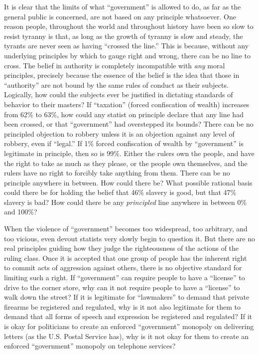 \documentclass{book}
\begin{document}
It is clear that the limits of what \enquote{government} is allowed to do, as far as the general public is concerned, are not based on any principle whatsoever. One reason people, throughout the world and throughout history have been so slow to resist tyranny is that, as long as the growth of tyranny is slow and steady, the tyrants are never seen as having \enquote{crossed the line.} This is because, without any underlying principles by which to gauge right and wrong, there can be no line to cross. The belief in authority is completely incompatible with \emph{any} moral principles, precisely because the essence of the belief is the idea that those in \enquote{authority} are not bound by the same rules of conduct as their subjects. Logically, how could the subjects ever be justified in dictating standards of behavior to their masters? If \enquote{taxation} (forced confiscation of wealth) increases from 62\% to 63\%, how could any statist on principle declare that any line had been crossed, or that \enquote{government} had overstepped its bounds? There can be no principled objection to robbery unless it is an objection against any level of robbery, even if \enquote{legal.} If 1\% forced confiscation of wealth by \enquote{government} is legitimate in principle, then so is 99\%. Either the rulers own the people, and have the right to take as much as they please, or the people own themselves, and the rulers have no right to forcibly take anything from them. There can be no principle anywhere in between. How could there be? What possible rational basis could there be for holding the belief that 46\% slavery is good, but that 47\% slavery is bad? How could there be any \emph{principled} line anywhere in between 0\% and 100\%?

When the violence of \enquote{government} becomes too widespread, too arbitrary, and too vicious, even devout statists very slowly begin to question it. But there are no real principles guiding how they judge the righteousness of the actions of the ruling class. Once it is accepted that one group of people has the inherent right to commit acts of aggression against others, there is no objective standard for limiting such a right. If \enquote{government} can require people to have a \enquote{license} to drive to the corner store, why can it not require people to have a \enquote{license} to walk down the street? If it is legitimate for \enquote{lawmakers} to demand that private firearms be registered and regulated, why is it not also legitimate for them to demand that all forms of speech and expression be registered and regulated? If it is okay for politicians to create an enforced \enquote{government} monopoly on delivering letters (as the U.S. Postal Service has), why is it not okay for them to create an enforced \enquote{government} monopoly on telephone services?
\end{document}
